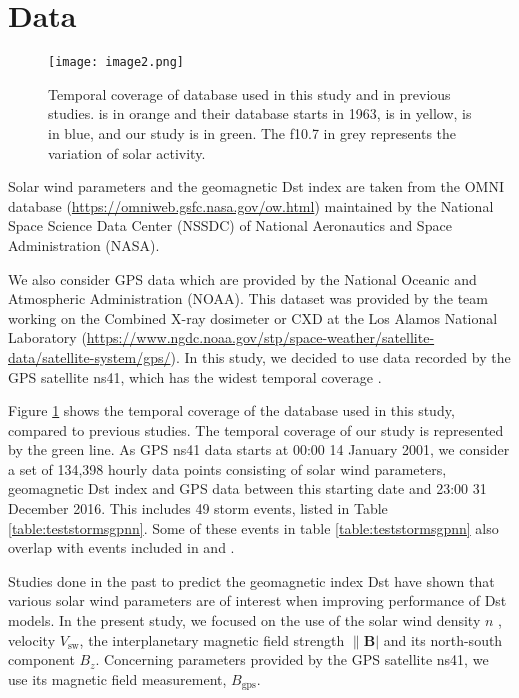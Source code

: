 \section{Data}\label{sec:datagpnn}

\begin{figure}
	\texttt{[image: image2.png]}
	\caption{Temporal coverage of database used in this study and in previous studies. \citet{wu1997geomagnetic} 
	is in orange and their database starts in 1963, \citet{Bala2012} is in yellow, \citet{Lazzus} is in blue, and our study is in green. 
	The f10.7 in grey represents the variation of solar activity.}
	\label{fig:datacoverage}
\end{figure}


Solar wind parameters and the geomagnetic Dst index are taken from the OMNI database 
(\url{https://omniweb.gsfc.nasa.gov/ow.html}) maintained by the National Space Science Data Center (NSSDC) 
of National Aeronautics and Space Administration (NASA).

We also consider GPS data which are provided by the National Oceanic and Atmospheric Administration (NOAA). 
This dataset was provided by the team working on the Combined X-ray dosimeter or CXD at the 
Los Alamos National Laboratory (\url{https://www.ngdc.noaa.gov/stp/space-weather/satellite-data/satellite-system/gps/}). 
In this study, we decided to use data recorded by the GPS satellite ns41, which has the widest temporal coverage 
\citep{morley2017energetic}. 

Figure \ref{fig:datacoverage} shows the temporal coverage of the database used in this study, compared to 
previous studies. The temporal coverage of our study is represented by the green line. As GPS ns41 data 
starts at 00:00 14 January 2001, we consider a set of 134,398 hourly data points consisting of 
solar wind parameters, geomagnetic Dst index and GPS data between this starting date and 23:00 31 December 2016. 
This includes 49 storm events, listed in Table \ref{table:teststormsgpnn}. Some of these events in table 
\ref{table:teststormsgpnn} also overlap with events included in \citet{Ji2012} and \citet{ChandorkarDst}. 

Studies done in the past to predict the geomagnetic index Dst have shown that various solar wind parameters 
are of interest when improving performance of Dst models. In the present study, we focused on the use 
of the solar wind density $n$ , velocity  $V_{\text{sw}}$, the interplanetary magnetic field 
strength $\|\mathbf{B}|$ and its north-south component $B_{z}$. Concerning parameters provided by 
the GPS satellite ns41, we use its magnetic field measurement, $B_{\text{gps}}$.


